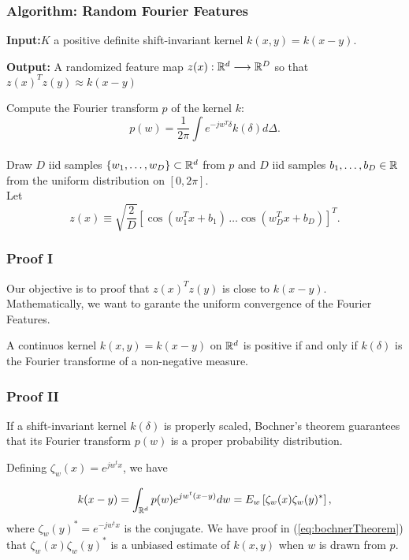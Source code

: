 \begin{frame}
  \frametitle{Algorithm: Random Fourier Features}

  \textbf{Input:}$K$ a positive definite shift-invariant kernel $k(x,y) = k(x - y).$

  \textbf{Output:} A randomized feature map $z(x): \mathbb{R}^d \longrightarrow \mathbb{R}^D$
   so that $z(x)^T z(y) \approx k(x - y)$

   Compute the Fourier transform $p$ of the kernel $k$: 
  \begin{equation}
      p(w) = \frac{1}{2 \pi}
      \int
      e^{-jw^T \delta}k(\delta) 
      d \Delta. 
   \end{equation}
      \\
   Draw $D$ iid samples 
   $\{w_1, \ldots, w_D \} \subset \mathbb{R}^d$ from $p$ and
   $D$ iid samples $b_1, \ldots, b_D \in \mathbb{R}$
   from the uniform distribution on 
   $[0, 2\pi]$. 
   \\
   Let 
   \begin{equation}
      z(x)
      \equiv
      \sqrt{\frac{2}{D}}
      \left[ 
          \cos(w_1^T x + b_1) 
          \, 
          \ldots
          \cos(w_D^T x + b_D) 
          \right]^T. 
   \end{equation}
  
\end{frame}

\begin{frame}
  \frametitle{Proof I}
  Our objective is to proof that $z(x)^Tz(y)$ is close to $k(x-y)$. 
  Mathematically, we want to garante the uniform convergence of the Fourier Features. 
  
  \begin{theorem}
    A continuos kernel $k(x,y) = k(x-y)$ on $\mathbb{R}^d$ is positive 
    if and only if $k(\delta)$ is the Fourier transforme of a non-negative measure. 
\end{theorem}
\end{frame}

\begin{frame}
  \frametitle{Proof II}

  If a shift-invariant kernel $k(\delta)$ is properly scaled, Bochner’s theorem guarantees that its Fourier transform 
$p(w)$
is a proper probability distribution.

Defining $\zeta_w(x) = e^{jw^tx}$, we have

\begin{equation}
    \label{eq:bochnerTheorem}
    k(x-y)
    =
    \int_{\mathbb{R}^d}
    p(w)
    e^{jw^t(x-y)}
    dw
    = 
    E_w\left[
        \zeta_w(x)
        \zeta_w(y)^*
    \right],
\end{equation}
where $\zeta_w(y)^* =  e^{- jw^tx}$ is the conjugate. 
We have proof in (\ref{eq:bochnerTheorem}) that $  \zeta_w(x)
\zeta_w(y)^*$ is a unbiased estimate of $k(x,y)$ when $w$ is drawn from $p$. 


\end{frame}



